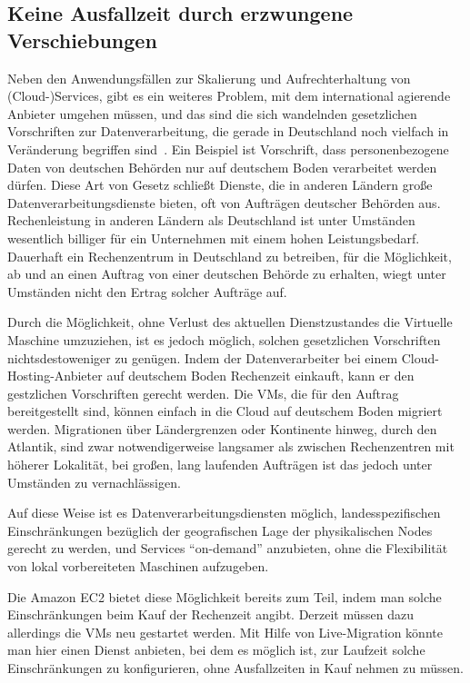 \subsection{Keine Ausfallzeit durch erzwungene Verschiebungen}
\label{sec:keine-ausfallzeit}
Neben den Anwendungsfällen zur Skalierung und Aufrechterhaltung von
(Cloud-)Services, gibt es ein weiteres Problem, mit dem international
agierende Anbieter umgehen müssen, und das sind die sich wandelnden
gesetzlichen Vorschriften zur Datenverarbeitung, die gerade in
Deutschland noch vielfach in Veränderung begriffen
sind~\cite{bdsg-2009}. Ein Beispiel ist Vorschrift, dass
personenbezogene Daten von deutschen Behörden nur auf deutschem Boden
verarbeitet werden dürfen. Diese Art von Gesetz schließt Dienste, die
in anderen Ländern große Datenverarbeitungsdienste bieten, oft von
Aufträgen deutscher Behörden aus. Rechenleistung in anderen Ländern
als Deutschland ist unter Umständen wesentlich billiger für ein
Unternehmen mit einem hohen Leistungsbedarf. Dauerhaft ein
Rechenzentrum in Deutschland zu betreiben, für die Möglichkeit, ab und
an einen Auftrag von einer deutschen Behörde zu erhalten, wiegt unter
Umständen nicht den Ertrag solcher Aufträge auf.

Durch die Möglichkeit, ohne Verlust des aktuellen Dienstzustandes die
Virtuelle Maschine umzuziehen, ist es jedoch möglich, solchen
gesetzlichen Vorschriften nichtsdestoweniger zu genügen. Indem der
Datenverarbeiter bei einem Cloud-Hosting-Anbieter auf deutschem Boden
Rechenzeit einkauft, kann er den gestzlichen Vorschriften gerecht
werden. Die \acp{VM}, die für den Auftrag bereitgestellt sind, können
einfach in die Cloud auf deutschem Boden migriert werden. Migrationen
über Ländergrenzen oder Kontinente hinweg, \zB durch den Atlantik,
sind zwar notwendigerweise langsamer als zwischen Rechenzentren mit
höherer Lokalität, bei großen, lang laufenden Aufträgen ist das jedoch
unter Umständen zu vernachlässigen.

Auf diese Weise ist es Datenverarbeitungsdiensten möglich,
landesspezifischen Einschränkungen bezüglich der geografischen Lage
der physikalischen Nodes gerecht zu werden, und Services "`on-demand"'
anzubieten, ohne die Flexibilität von lokal vorbereiteten Maschinen
aufzugeben.

Die Amazon EC2 bietet diese Möglichkeit bereits zum Teil, indem man
solche Einschränkungen beim Kauf der Rechenzeit angibt. Derzeit müssen
dazu allerdings die \acp{VM} neu gestartet werden. Mit Hilfe von
Live-Migration könnte man hier einen Dienst anbieten, bei dem es
möglich ist, zur Laufzeit solche Einschränkungen zu konfigurieren,
ohne Ausfallzeiten in Kauf nehmen zu müssen.

